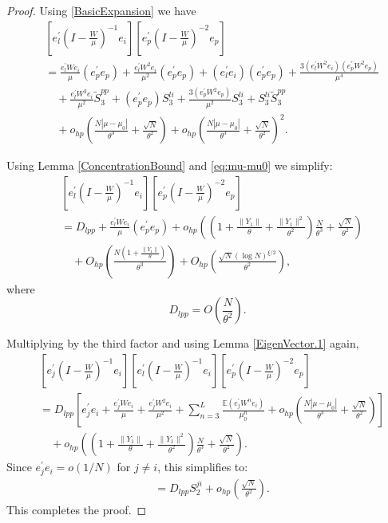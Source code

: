 \documentclass[11pt, reqno]{amsart}
\numberwithin{equation}{section}
\begin{document}
\begin{proof}
Using \eqref{BasicExpansion} we have
\begin{align}
&\left[e_l^\prime\left(I - \frac{W}{\mu}\right)^{-1}e_i\right]\left[e_p^\prime\left(I - \frac{W}{\mu}\right)^{-2}e_p\right] \nonumber \\
&= \frac{e_l^\prime W e_i}{\mu}(e_p^\prime e_p)
+ \frac{e_l^\prime W^2 e_i}{\mu^2}(e_p^\prime e_p)
+ (e_l^\prime e_i)(e_p^\prime e_p)
+ \frac{3(e_l^\prime W^2 e_i)(e_p^\prime W^2 e_p)}{\mu^4} \\ &\quad + \frac{e_l^\prime W^2 e_i}{\mu^2}\tilde S_3^{pp}
+ (e_p^\prime e_p) S_3^{li}
+ \frac{3(e_p^\prime W^2 e_p)}{\mu^2}S_3^{li}
+ S_3^{li}\tilde S_3^{pp} \nonumber\\
&\quad + o_{hp}\left(\frac{N|\mu - \mu_0|}{\theta^3} + \frac{\sqrt{N}}{\theta^2}\right)
+ o_{hp}\left(\frac{N|\mu - \mu_0|}{\theta^3} + \frac{\sqrt{N}}{\theta^2}\right)^2.\label{eq:eigenv3-1}
\end{align}

 Using Lemma \ref{ConcentrationBound} and \ref{eq:mu-mu0} we simplify:
\begin{align}
&\left[e_l^\prime\left(I - \frac{W}{\mu}\right)^{-1}e_i\right]\left[e_p^\prime\left(I - \frac{W}{\mu}\right)^{-2}e_p\right] \nonumber\\
&= D_{lpp} + \frac{e_l^\prime W e_i}{\mu}(e_p^\prime e_p)
+ o_{hp}\left(\left(1 + \frac{\|Y_1\|}{\theta} + \frac{\|Y_1\|^2}{\theta^2}\right)\frac{N}{\theta^3} + \frac{\sqrt{N}}{\theta^2}\right) \nonumber\\
&\quad + O_{hp}\left(\frac{N(1+\frac{\|Y_1\|}{\theta})}{\theta^3}\right)
+ O_{hp}\left(\frac{\sqrt{N}(\log N)^{\xi/2}}{\theta^2}\right),\label{EigenVector.3.intermd}
\end{align}
where
\[
D_{lpp} = O\left(\frac{N}{\theta^2}\right).
\]

Multiplying by the third factor and using Lemma \ref{EigenVector.1} again,
\begin{align*}
&\left[e_j^\prime\left(I - \frac{W}{\mu}\right)^{-1}e_i\right]\left[e_l^\prime\left(I - \frac{W}{\mu}\right)^{-1}e_i\right]\left[e_p^\prime\left(I - \frac{W}{\mu}\right)^{-2}e_p\right] \\
&= D_{lpp}\left[e_j^\prime e_i + \frac{e_j^\prime W e_i}{\mu} + \frac{e_j^\prime W^2 e_i}{\mu^2} + \sum_{n=3}^L \frac{\mathbb E(e_j^\prime W^n e_i)}{\mu_0^n} + o_{hp}\left(\frac{N|\mu-\mu_0|}{\theta^3}+\frac{\sqrt{N}}{\theta^2}\right)\right]\\
&\quad + o_{hp}\left(\left(1 + \frac{\|Y_1\|}{\theta} + \frac{\|Y_1\|^2}{\theta^2}\right)\frac{N}{\theta^3}+\frac{\sqrt{N}}{\theta^2}\right).
\end{align*}
Since $e_j^\prime e_i=o(1/N)$ for $j\neq i$, this simplifies to:
\begin{align*}
&= D_{lpp}S_2^{ji} + o_{hp}\left( \frac{\sqrt{N}}{\theta^2}\right).
\end{align*}
This completes the proof.
\end{proof}
\end{document}
